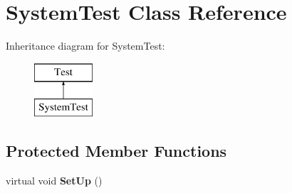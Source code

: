 \hypertarget{class_system_test}{\section{System\-Test Class Reference}
\label{class_system_test}
}
Inheritance diagram for System\-Test\-:\begin{figure}[H]
\begin{center}
\leavevmode
\includegraphics[height=2.000000cm]{class_system_test}
\end{center}
\end{figure}
\subsection*{Protected Member Functions}
\begin{DoxyCompactItemize}
\item 
\hypertarget{class_system_test_a611fccdf6ed757b80f2dda918ed27bc0}{virtual void {\bfseries Set\-Up} ()}\label{class_system_test_a611fccdf6ed757b80f2dda918ed27bc0}

\end{DoxyCompactItemize}
